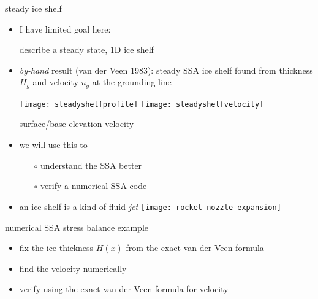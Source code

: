 \begin{frame}{steady ice shelf}

\begin{itemize}
\item I have limited goal here:

\begin{center}
\alert{describe a steady state, 1D ice shelf}
\end{center}
\item \emph{by-hand} result (van der Veen 1983): steady SSA ice shelf found from thickness $H_g$ and velocity $u_g$ at the grounding line

\begin{center}
  \texttt{[image: steadyshelfprofile]} \qquad \qquad
  \texttt{[image: steadyshelfvelocity]}
\end{center}

{\scriptsize \hspace{16mm} surface/base elevation \hspace{40mm} velocity}

\item we will use this to
  \begin{itemize}
  \item[$\circ$] understand the SSA better
  \item[$\circ$] verify a numerical SSA code
  \end{itemize}

\vspace{-9mm}
\item an ice shelf is a kind of fluid \emph{jet} \hfill \texttt{[image: rocket-nozzle-expansion]}
\end{itemize}
\end{frame}


\begin{frame}{numerical SSA stress balance example}

\begin{itemize}
\item fix the ice thickness $H(x)$ from the exact van der Veen formula
\item find the velocity numerically
\item verify using the exact van der Veen formula for velocity
\end{itemize}
\end{frame}


